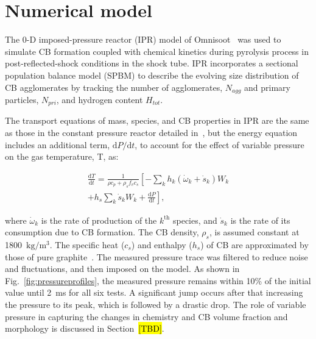\section{Numerical model}

The 0-D imposed-pressure reactor (IPR) model of Omnisoot~\citep{adib2025omnisoot} was used to simulate CB formation coupled with chemical kinetics during pyrolysis process in post-reflected-shock conditions in the shock tube. IPR incorporates a sectional population balance model (SPBM) to describe the evolving size distribution of CB agglomerates by tracking the number of agglomerates, $N_{agg}$ and primary particles, $N_{pri}$, and hydrogen content $H_{tot}$. 

The transport equations of mass, species, and CB properties in IPR are the same as those in the constant pressure reactor detailed in~\citep{adib2025omnisoot}, but the energy equation includes an additional term, $\mathrm{d}P/\mathrm{d}t$, to account for the effect of variable pressure on the gas temperature, T, as:

\begin{equation}
    \begin{split}
        \frac{\mathrm{d} T}{\mathrm{d} t}=
        \frac{1}{\rho c_p+\rho_{s}f_v c_{s}}
        \left[
        -\sum_k h_k
        \left(
        \dot{\omega}_k+\dot{s}_k
        \right) W_k \right. \\
        \left.
        +h_{s}\sum_k \dot{s}_k W_k
        +\frac{\mathrm{d}P}{\mathrm{d}t}
        \right],
        \label{eqn:energypressure}
    \end{split}
\end{equation}

\noindent where $\dot{\omega}_k$ is the rate of production of the $k^{\mathrm{th}}$ species, and $\dot{s}_k$ is the rate of its consumption due to CB formation. The CB density, $\rho_{s}$, is assumed constant at 1800~$\mathrm{kg/m^3}$. The specific heat ($c_{s}$) and enthalpy ($h_{s}$) of CB are approximated by those of pure graphite~\cite{mcbride1993coefficients}. The measured pressure trace was filtered to reduce noise and fluctuations, and then imposed on the model. As shown in Fig.~\ref{fig:pressureprofiles}, the measured pressure remains within 10\% of the initial value until 2~ms for all six tests. A significant jump occurs after that increasing the pressure to its peak, which is followed by a drastic drop. The role of variable pressure in capturing the changes in chemistry and CB volume fraction and morphology is discussed in Section~\hl{[TBD]}.

